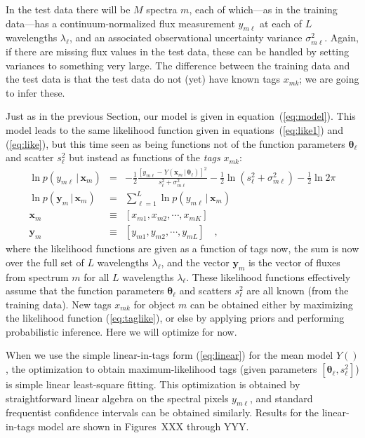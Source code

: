 \documentclass[12pt, preprint]{aastex}
\newcommand{\sectionname}{Section}
\newcommand{\set}[1]{\bm{#1}}
\newcommand{\given}{\,|\,}
\begin{document}
In the test data there will be $M$ spectra $m$, each of which---as in
the training data---has a continuum-normalized flux measurement
$y_{m\ell}$ at each of $L$ wavelengths $\lambda_\ell$, and an
associated observational uncertainty variance $\sigma_{m\ell}^2$.
Again, if there are missing flux values in the test data, these can be
handled by setting variances to something very large.
The difference between the training data and the test data is that the
test data do not (yet) have known tags $x_{mk}$; we are going to infer
these.

Just as in the previous \sectionname, our model is given in
equation~(\ref{eq:model}).
This model leads to the same likelihood function given in
equations~(\ref{eq:like1}) and (\ref{eq:like}), but this time seen as
being functions not of the function parameters $\set{\theta}_\ell$ and
scatter $s_\ell^2$ but instead as functions of the \emph{tags}
$x_{mk}$:
\begin{eqnarray}
\ln p(y_{m\ell}\given\set{x}_m) &=&
 -\frac{1}{2}\frac{[y_{m\ell} - Y(\set{x}_m\given\set{\theta}_\ell)]^2}{s_\ell^2 + \sigma_{m\ell}^2}
 -\frac{1}{2}\ln(s_\ell^2 + \sigma_{m\ell}^2)
 -\frac{1}{2}\ln 2\pi
\\
\ln p(\set{y}_m\given\set{x}_m) &=&
 \sum_{\ell=1}^L \ln p(y_{m\ell}\given\set{x}_m)
\label{eq:taglike}\\
\set{x}_m &\equiv& [x_{m1}, x_{m2}, \cdots, x_{mK}]
\\
\set{y}_m &\equiv& [y_{m1}, y_{m2}, \cdots, y_{mL}]
\quad,
\end{eqnarray}
where the likelihood functions are given as a function of tags now,
the sum is now over the full set of $L$ wavelengths
$\lambda_\ell$, and the vector $\set{y}_m$ is the vector of fluxes from
spectrum $m$ for all $L$ wavelengths $\lambda_\ell$.
These likelihood functions effectively assume that the function
parameters $\set{\theta}_\ell$ and scatters $s_\ell^2$ are all known (from
the training data).
New tags $x_{mk}$ for object $m$ can be obtained either by maximizing
the likelihood function (\ref{eq:taglike}), or else by applying priors
and performing probabilistic inference.
Here we will optimize for now.

When we use the simple linear-in-tags form (\ref{eq:linear}) for the
mean model $Y()$, the optimization to obtain maximum-likelihood tags
(given parameters $[\set{\theta}_\ell, s_\ell^2]$) is simple linear
least-square fitting.
This optimization is obtained by straightforward linear algebra on the
spectral pixels $y_{m\ell}$, and standard frequentist confidence
intervals can be obtained similarly.
Results for the linear-in-tags model are shown in Figures~XXX through
YYY.
\end{document}
